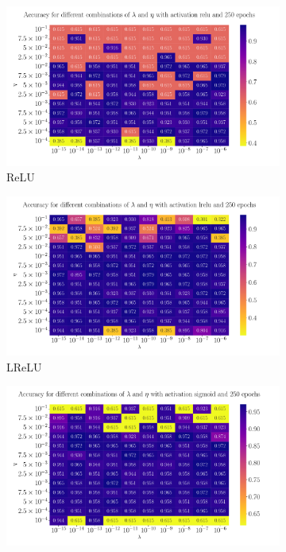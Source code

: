 \documentclass[%
reprint,
amsmath,amssymb,
aps,
]{revtex4-2}
\begin{document}
\begin{figure}[ht!]
	\begin{subfigure}{0.4353\textwidth}
		\includegraphics[width=\textwidth]{Python/Figures/Cancer_Accuracy_Heatmap_relu_Epochs250.pdf}
		\caption{ReLU}
		\label{fig:ReLU_heatmap}
	\end{subfigure}
	\hfill
	\begin{subfigure}{0.4353\textwidth}
		\includegraphics[width=\textwidth]{Python/Figures/Cancer_Accuracy_Heatmap_lrelu_Epochs250.pdf}
		\caption{LReLU}
		\label{fig:LReLU_heatmap}
	\end{subfigure}
	\hfill\newline
	\begin{subfigure}{0.4353\textwidth}
		\includegraphics[width=\textwidth]{Python/Figures/Cancer_Accuracy_Heatmap_sigmoid_Epochs250.pdf}

\end{subfigure}
\end{figure}
\end{document}
